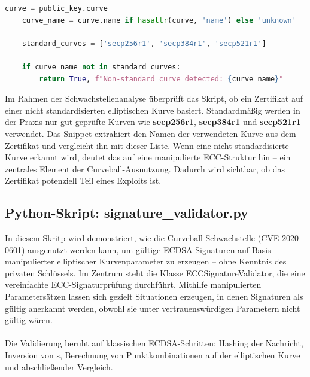 \documentclass{article}
\begin{document}
\begin{lstlisting}[language=Python,caption={analyze\_ecc\_parameter()-Methode}]
    curve = public_key.curve
    curve_name = curve.name if hasattr(curve, 'name') else 'unknown'

    standard_curves = ['secp256r1', 'secp384r1', 'secp521r1']

    if curve_name not in standard_curves:
        return True, f"Non-standard curve detected: {curve_name}"

\end{lstlisting}
Im Rahmen der Schwachstellenanalyse überprüft das Skript, ob ein Zertifikat auf einer nicht standardisierten elliptischen Kurve basiert. Standardmäßig werden in der Praxis nur gut geprüfte Kurven wie \textbf{secp256r1}, \textbf{secp384r1} und \textbf{secp521r1} verwendet. Das Snippet extrahiert den Namen der verwendeten Kurve aus dem Zertifikat und vergleicht ihn mit dieser Liste. Wenn eine nicht standardisierte Kurve erkannt wird, deutet das auf eine manipulierte ECC-Struktur hin – ein zentrales Element der Curveball-Ausnutzung. Dadurch wird sichtbar, ob das Zertifikat potenziell Teil eines Exploits ist.\\

\newpage

\subsection{Python-Skript: signature\_validator.py}
In diesem Skritp wird demonstriert, wie die Curveball-Schwachstelle (CVE-2020-0601) ausgenutzt werden kann, um gültige ECDSA-Signaturen auf Basis manipulierter elliptischer Kurvenparameter zu erzeugen – ohne Kenntnis des privaten Schlüssels. Im Zentrum steht die Klasse ECCSignatureValidator, die eine vereinfachte ECC-Signaturprüfung durchführt. Mithilfe manipulierten Parametersätzen lassen sich gezielt Situationen erzeugen, in denen Signaturen als gültig anerkannt werden, obwohl sie unter vertrauenswürdigen Parametern nicht gültig wären.\\
\\
Die Validierung beruht auf klassischen ECDSA-Schritten: Hashing der Nachricht, Inversion von s, Berechnung von Punktkombinationen auf der elliptischen Kurve und abschließender Vergleich.\\
\end{document}
